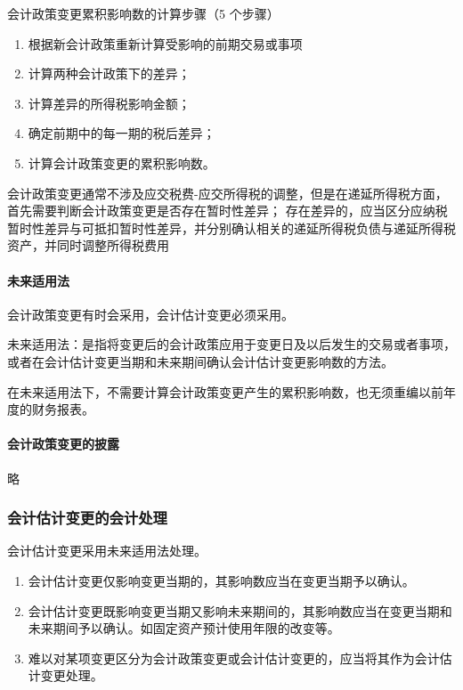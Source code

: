 \documentclass[UTF8,12pt]{ctexart}
\numberwithin{equation}{section} %
\numberwithin{figure}{section}
\numberwithin{table}{section}
\begin{document}
	会计政策变更累积影响数的计算步骤（5 个步骤）
	\begin{enumerate}
		\item 根据新会计政策重新计算受影响的前期交易或事项
		
		\item 计算两种会计政策下的差异；
		
		\item 计算差异的所得税影响金额；
		
		\item 确定前期中的每一期的税后差异；
		
		\item 计算会计政策变更的累积影响数。
	\end{enumerate}
	
	会计政策变更通常不涉及应交税费-应交所得税的调整，但是在递延所得税方面，首先需要判断会计政策变更是否存在暂时性差异；
	存在差异的，应当区分应纳税暂时性差异与可抵扣暂时性差异，并分别确认相关的递延所得税负债与递延所得税资产，并同时调整所得税费用
	
	\paragraph{未来适用法}
	会计政策变更有时会采用，会计估计变更必须采用。
	
	未来适用法：是指将变更后的会计政策应用于变更日及以后发生的交易或者事项，或者在会计估计变更当期和未来期间确认会计估计变更影响数的方法。
	
	在未来适用法下，不需要计算会计政策变更产生的累积影响数，也无须重编以前年度的财务报表。
	

	\paragraph{会计政策变更的披露}
	略
	
	\subsubsection{会计估计变更的会计处理}
	会计估计变更采用未来适用法处理。
	\begin{enumerate}
		\item 会计估计变更仅影响变更当期的，其影响数应当在变更当期予以确认。
		
		\item 会计估计变更既影响变更当期又影响未来期间的，其影响数应当在变更当期和未来期间予以确认。如固定资产预计使用年限的改变等。
		
		\item 难以对某项变更区分为会计政策变更或会计估计变更的，应当将其作为会计估计变更处理。
	\end{enumerate}
	
\end{document}

